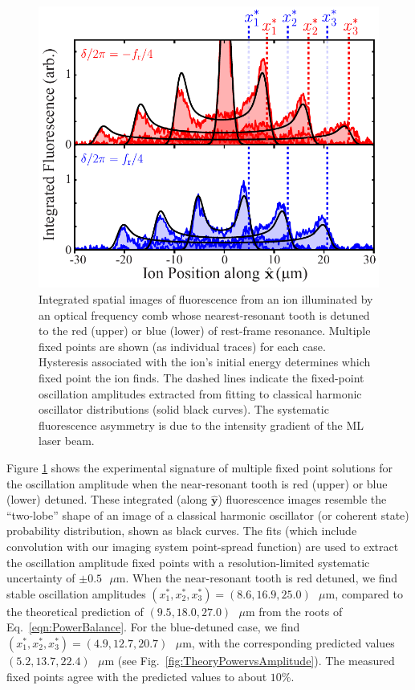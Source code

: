 \documentclass[preprint,superscriptaddress,amsmath,amssymb,aps,prl]{revtex4-1}
\begin{document}
\begin{figure}
\begin{center}
\includegraphics[width=1.0\columnwidth]{Column_Sums_06.pdf}
\end{center}
\caption{Integrated spatial images of fluorescence from an ion illuminated by an optical frequency comb whose nearest-resonant tooth is detuned to the red (upper) or blue (lower) of rest-frame resonance.  Multiple fixed points are shown (as individual traces) for each case.  Hysteresis associated with the ion's initial energy determines which fixed point the ion finds.  The dashed lines indicate the fixed-point oscillation amplitudes extracted from fitting to classical harmonic oscillator distributions (solid black curves). The systematic fluorescence asymmetry is due to the intensity gradient of the ML laser beam.}
\label{fig:ColumnSums}
\end{figure}

Figure \ref{fig:ColumnSums} shows the experimental signature of multiple fixed point solutions for the oscillation amplitude when the near-resonant tooth is red (upper) or blue (lower) detuned.  These integrated (along $\hat{\mathbf{y}}$) fluorescence images resemble the ``two-lobe'' shape of an image of a classical harmonic oscillator (or coherent state) probability distribution, shown as black curves.  The fits (which include convolution with our imaging system point-spread function) are used to extract the oscillation amplitude fixed points with a resolution-limited systematic uncertainty of $\pm 0.5 \mbox{ }\mu\mbox{m}$.  When the near-resonant tooth is red detuned, we find stable oscillation amplitudes $(x^\ast_1, x^\ast_2, x^\ast_3) = (8.6, 16.9, 25.0) \mbox{ }\mu\mbox{m}$, compared to the theoretical prediction of $(9.5, 18.0, 27.0)\mbox{ }\mu\mbox{m}$ from the roots of Eq.~\ref{eqn:PowerBalance}.  For the blue-detuned case, we find $(x^\ast_1, x^\ast_2, x^\ast_3) = (4.9, 12.7, 20.7) \mbox{ }\mu\mbox{m}$, with the corresponding predicted values $(5.2, 13.7, 22.4) \mbox{ }\mu\mbox{m}$ (see Fig.~\ref{fig:TheoryPowervsAmplitude}).  The measured fixed points agree with the predicted values to about $10$\%.
\end{document}
